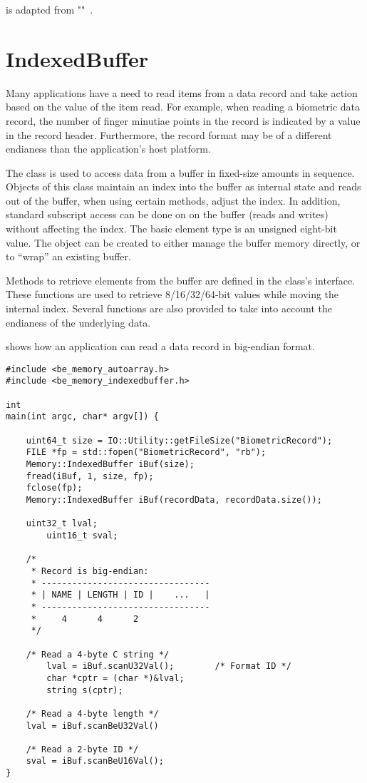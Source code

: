  is adapted from ""~\cite[496]{cpp:plguide}.

\section{IndexedBuffer}
\label{sec-indexedbuffer}
Many applications have a need to read items from a data record and take
action based on the value of the item read. For example, when reading a
biometric data record, the number of finger minutiae points in the record
is indicated by a value in the record header. Furthermore, the record format
may be of a different endianess than the application's host platform.

The  class is used to access data from a buffer in fixed-size
amounts in sequence. Objects of this class maintain an index into the buffer
as internal state and reads out of the buffer, when using certain methods,
adjust the index. In addition, standard subscript access can be done on
on the buffer (reads and writes) without affecting the index. The basic element
type is an unsigned eight-bit value.
The  object can be created to either manage the buffer memory
directly, or to ``wrap'' an existing buffer. 

Methods to retrieve elements from the buffer are defined in the class's
interface. These functions are used to retrieve 8/16/32/64-bit values while
moving the internal index. Several functions are also provided to take into
account the endianess of the underlying data.

 shows how an application can read a data record in
big-endian format.

\begin{lstlisting}[caption={Using the \class{IndexedBuffer}}, label=lst:indexedbufferuse]
#include <be_memory_autoarray.h>
#include <be_memory_indexedbuffer.h>

int
main(int argc, char* argv[]) {

	uint64_t size = IO::Utility::getFileSize("BiometricRecord");
	FILE *fp = std::fopen("BiometricRecord", "rb");
	Memory::IndexedBuffer iBuf(size);
	fread(iBuf, 1, size, fp);
	fclose(fp);
	Memory::IndexedBuffer iBuf(recordData, recordData.size());

	uint32_t lval;
        uint16_t sval;

	/*
	 * Record is big-endian:
	 * ---------------------------------
	 * | NAME | LENGTH | ID |    ...   |
	 * ---------------------------------
	 *     4      4      2
	 */

	/* Read a 4-byte C string */
        lval = iBuf.scanU32Val();        /* Format ID */
        char *cptr = (char *)&lval;
        string s(cptr);

	/* Read a 4-byte length */
	lval = iBuf.scanBeU32Val()

	/* Read a 2-byte ID */
	sval = iBuf.scanBeU16Val();
}
\end{lstlisting}
